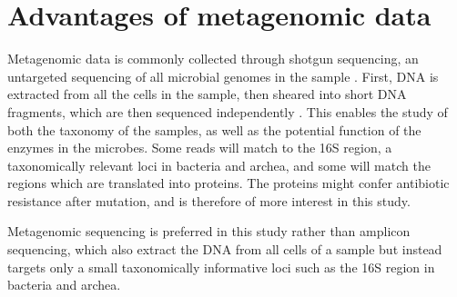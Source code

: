 \section{Advantages of metagenomic data}
Metagenomic data is commonly collected through shotgun sequencing, an untargeted sequencing of all microbial genomes in the sample \cite{quince2017ShotgunMetagenomicsSampling}.
First, DNA is extracted from all the cells in the sample, then sheared into short DNA fragments, which are then sequenced independently \cite{sharpton2014IntroductionAnalysisShotgun}. 
This enables the study of both the taxonomy of the samples, as well as the potential function of the enzymes in the microbes.
Some reads will match to the 16S region, a taxonomically relevant loci in bacteria and archea, and some will match the regions which are translated into proteins. 
The proteins might confer antibiotic resistance after mutation, and is therefore of more interest in this study.

Metagenomic sequencing is preferred in this study rather than amplicon sequencing, which also extract the DNA from all cells of a sample but instead targets only a small taxonomically informative loci such as the 16S region in bacteria and archea.



